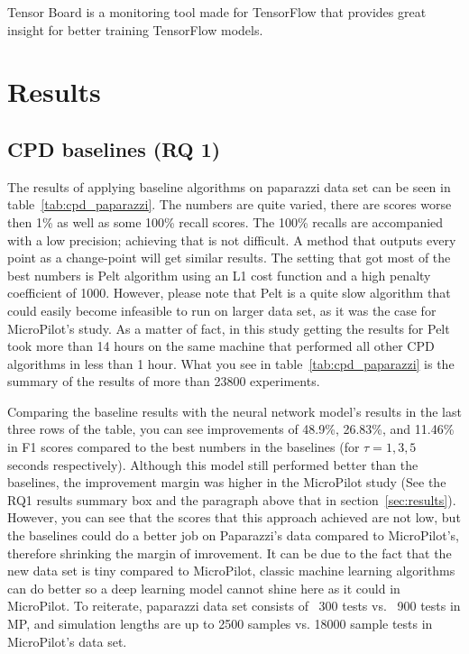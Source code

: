 Tensor Board is a monitoring tool made for TensorFlow \cite{tensorflow2015-whitepaper} that provides great insight for better training TensorFlow models.

\section{Results}
\subsection{CPD baselines (RQ 1)}

The results of applying baseline algorithms on paparazzi data set can be seen in table~\ref{tab:cpd_paparazzi}.
The numbers are quite varied, there are scores worse then 1\% as well as some 100\% recall scores. The 100\% recalls are accompanied with a low precision; achieving that is not difficult. A method that outputs every point as a change-point will get similar results. The setting that got most of the best numbers is Pelt algorithm using an L1 cost function and a high penalty coefficient of 1000. However, please note that Pelt is a quite slow algorithm that could easily become infeasible to run on larger data set, as it was the case for MicroPilot's study. As a matter of fact, in this study getting the results for Pelt took more than 14 hours on the same machine that performed all other CPD algorithms in less than 1 hour. What you see in table~\ref{tab:cpd_paparazzi} is the summary of the results of more than 23800 experiments. 

Comparing the baseline results with the neural network model's results in the last three rows of the table, you can see improvements of 48.9\%, 26.83\%, and 11.46\% in F1 scores compared to the best numbers in the baselines (for $\tau = 1, 3, 5$ seconds respectively). Although this model still performed better than the baselines, the improvement margin was higher in the MicroPilot study (See the RQ1 results summary box and the paragraph above that in section~\ref{sec:results}). However, you can see that the scores that this approach achieved are not low, but the baselines could do a better job on Paparazzi's data compared to MicroPilot's, therefore shrinking the margin of imrovement. It can be due to the fact that the new data set is tiny compared to MicroPilot, classic machine learning algorithms can do better so a deep learning model cannot shine here as it could in MicroPilot. To reiterate, paparazzi data set consists of ~300 tests vs. ~900 tests in MP, and simulation lengths are up to 2500 samples vs. 18000 sample tests in MicroPilot's data set.

